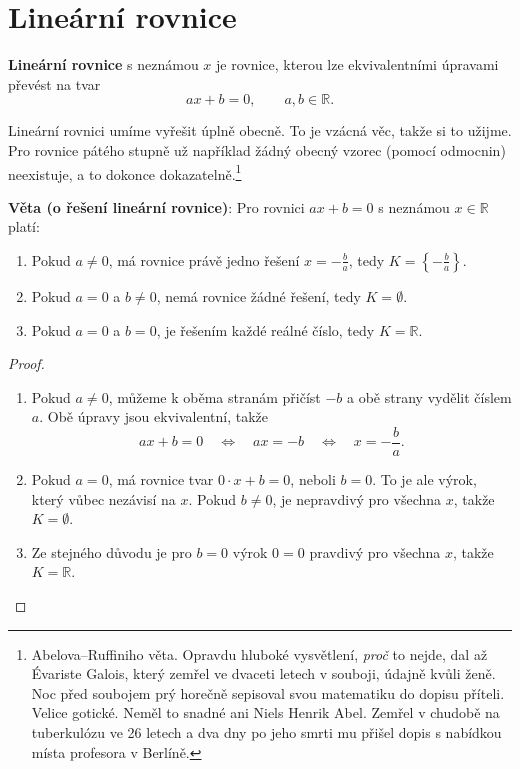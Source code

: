 \section{Lineární rovnice}\label{sec:linearni-rovnice}

\begin{definitionbox}
  \textbf{Lineární rovnice} s neznámou $x$ je rovnice, kterou lze ekvivalentními úpravami převést na tvar
  \begin{equation*}
    ax + b = 0,\qquad a, b\in\mathbb{R}.
  \end{equation*}
\end{definitionbox}

Lineární rovnici umíme vyřešit úplně obecně. To je vzácná věc, takže si to užijme. Pro rovnice pátého stupně už například žádný obecný vzorec (pomocí odmocnin) neexistuje, a to dokonce dokazatelně.\footnote{Abelova--Ruffiniho věta. Opravdu hluboké vysvětlení, \textit{proč} to nejde, dal až Évariste Galois, který zemřel ve dvaceti letech v souboji, údajně kvůli ženě. Noc před soubojem prý horečně sepisoval svou matematiku do dopisu příteli. Velice gotické. Neměl to snadné ani Niels Henrik Abel. Zemřel v chudobě na tuberkulózu ve 26 letech a dva dny po jeho smrti mu přišel dopis s nabídkou místa profesora v Berlíně.}

\begin{definitionbox}
  \textbf{Věta (o řešení lineární rovnice)}: Pro rovnici $ax + b = 0$ s neznámou $x\in\mathbb{R}$ platí:
  \begin{enumerate}
    \item Pokud $a\neq 0$, má rovnice právě jedno řešení $x = -\frac{b}{a}$, tedy $K = \left\{-\frac{b}{a}\right\}$.
    \item Pokud $a = 0$ a $b\neq 0$, nemá rovnice žádné řešení, tedy $K = \emptyset$.
    \item Pokud $a = 0$ a $b = 0$, je řešením každé reálné číslo, tedy $K = \mathbb{R}$.
  \end{enumerate}
\end{definitionbox}

\begin{proof}
  \begin{enumerate}
    \item Pokud $a\neq 0$, můžeme k oběma stranám přičíst $-b$ a obě strany vydělit číslem $a$. Obě úpravy jsou ekvivalentní, takže
    \begin{equation*}
      ax + b = 0\quad\Leftrightarrow\quad ax = -b\quad\Leftrightarrow\quad x = -\frac{b}{a}.
    \end{equation*}
    \item Pokud $a = 0$, má rovnice tvar $0\cdot x + b = 0$, neboli $b = 0$. To je ale výrok, který vůbec nezávisí na $x$. Pokud $b\neq 0$, je nepravdivý pro všechna $x$, takže $K = \emptyset$.
    \item Ze stejného důvodu je pro $b = 0$ výrok $0 = 0$ pravdivý pro všechna $x$, takže $K = \mathbb{R}$.
  \end{enumerate}
\end{proof}

